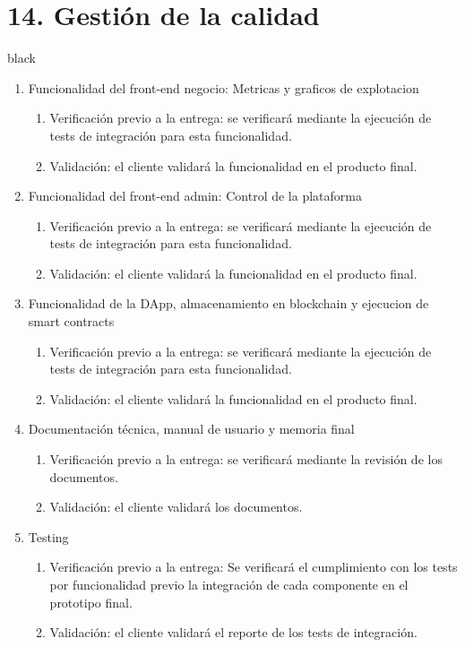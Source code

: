 \documentclass[
11pt, %
]{charter}
\begin{document}
\section{14. Gestión de la calidad}
\label{sec:calidad}
\begin{consigna}{black}
\begin{enumerate}
		\item Funcionalidad del front-end negocio: Metricas y graficos de explotacion
		\begin{enumerate}				
			\item Verificación previo a la entrega: se verificará mediante la ejecución de tests de integración para esta funcionalidad.			
			\item Validación: el cliente validará la funcionalidad en el producto final.			
		\end{enumerate}		
		
		\item Funcionalidad del front-end admin: Control de la plataforma
		\begin{enumerate}				
			\item Verificación previo a la entrega: se verificará mediante la ejecución de tests de integración para esta funcionalidad.			
			\item Validación: el cliente validará la funcionalidad en el producto final.			
		\end{enumerate}		
	
		\item Funcionalidad de la DApp, almacenamiento en blockchain y ejecucion de smart contracts
		\begin{enumerate}				
			\item Verificación previo a la entrega: se verificará mediante la ejecución de tests de integración para esta funcionalidad.			
			\item Validación: el cliente validará la funcionalidad en el producto final.			
		\end{enumerate}			
	
			
		
		\item Documentación técnica, manual de usuario y memoria final
		\begin{enumerate}				
			\item Verificación previo a la entrega: se verificará mediante la revisión de los documentos.			
			\item Validación: el cliente validará los documentos.			
		\end{enumerate}			
		
		\item Testing
		\begin{enumerate}				
			\item Verificación previo a la entrega: Se verificará el cumplimiento con los tests por funcionalidad previo la integración de cada componente en el prototipo final. 
			\item Validación: el cliente validará el reporte de los tests de integración.
		\end{enumerate}			
		
		
\end{enumerate}


\end{consigna}
\end{document}
